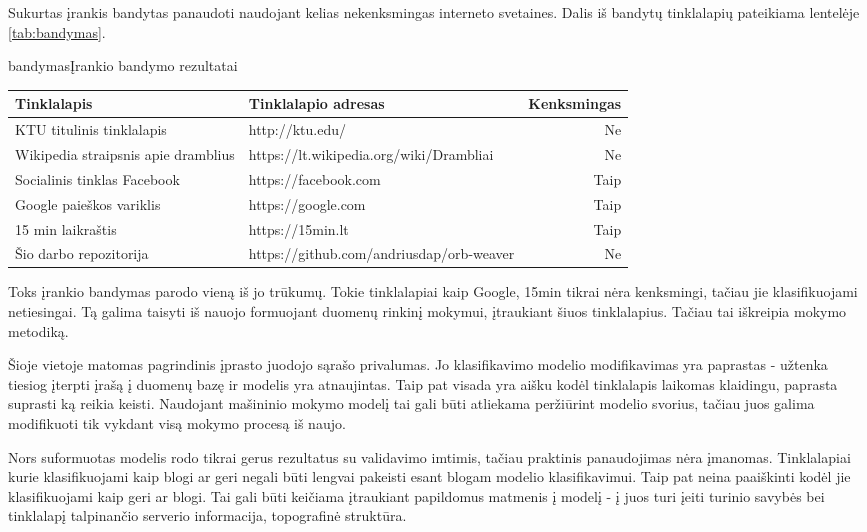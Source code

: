 
Sukurtas įrankis bandytas panaudoti naudojant kelias nekenksmingas interneto svetaines. Dalis iš bandytų
tinklalapių pateikiama lentelėje \vref{tab:bandymas}.

\begin{ktutable}{bandymas}{Įrankio bandymo rezultatai}
    \begin{tabular}{|p{5 cm}|p{5 cm}|r|}
    \hline
    Tinklalapis & Tinklalapio adresas & Kenksmingas \\ \hline
    KTU titulinis tinklalapis & http://ktu.edu/ & Ne \\ \hline
    Wikipedia straipsnis apie dramblius & https://lt.wikipedia.org/wiki/Drambliai & Ne \\ \hline
    Socialinis tinklas Facebook & https://facebook.com & Taip \\ \hline
    Google paieškos variklis & https://google.com & Taip \\ \hline
    15 min laikraštis & https://15min.lt & Taip \\ \hline
    Šio darbo repozitorija & https://github.com/andriusdap/orb-weaver & Ne \\ \hline
    \end{tabular}
\end{ktutable}

Toks įrankio bandymas parodo vieną iš jo trūkumų. Tokie tinklalapiai kaip Google, 15min tikrai nėra kenksmingi,
tačiau jie klasifikuojami netiesingai. Tą galima taisyti iš nauojo formuojant duomenų rinkinį mokymui,
įtraukiant šiuos tinklalapius. Tačiau tai iškreipia mokymo metodiką.

Šioje vietoje matomas pagrindinis įprasto juodojo sąrašo privalumas. Jo klasifikavimo modelio modifikavimas yra
paprastas - užtenka tiesiog įterpti įrašą į duomenų bazę ir modelis yra atnaujintas. Taip pat visada yra aišku
kodėl tinklalapis laikomas klaidingu, paprasta suprasti ką reikia keisti. Naudojant mašininio mokymo modelį tai
gali būti atliekama peržiūrint modelio svorius, tačiau juos galima modifikuoti tik vykdant visą mokymo procesą iš naujo.

Nors suformuotas modelis rodo tikrai gerus rezultatus su validavimo imtimis, tačiau praktinis panaudojimas nėra
įmanomas. Tinklalapiai kurie klasifikuojami kaip blogi ar geri negali būti lengvai pakeisti esant blogam modelio
klasifikavimui. Taip pat neina paaiškinti kodėl jie klasifikuojami kaip geri ar blogi. Tai gali būti keičiama
įtraukiant papildomus matmenis į modelį - į juos turi įeiti turinio savybės bei tinklalapį talpinančio serverio
informacija, topografinė struktūra.
